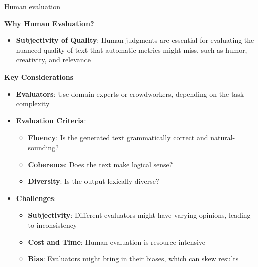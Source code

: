 \begin{vbframe}{Human evaluation}

\textbf{Why Human Evaluation?}
\begin{itemize}
    \item \textbf{Subjectivity of Quality}: Human judgments are essential for evaluating the nuanced quality of text that automatic metrics might miss, such as humor, creativity, and relevance
\end{itemize}

\textbf{Key Considerations}
\begin{itemize}
    \item \textbf{Evaluators}: Use domain experts or crowdworkers, depending on the task complexity
    \item \textbf{Evaluation Criteria}:
    \begin{itemize}
        \item \textbf{Fluency}: Is the generated text grammatically correct and natural-sounding?
        \item \textbf{Coherence}: Does the text make logical sense?
        \item \textbf{Diversity}: Is the output lexically diverse?
    \end{itemize}
    \item \textbf{Challenges}: 
    \begin{itemize}
        \item \textbf{Subjectivity}: Different evaluators might have varying opinions, leading to inconsistency
        \item \textbf{Cost and Time}: Human evaluation is resource-intensive
        \item \textbf{Bias}: Evaluators might bring in their biases, which can skew results
    \end{itemize}
\end{itemize}
   
\end{vbframe}


\endlecture

